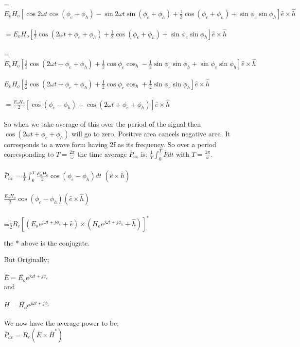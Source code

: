 =$E_{o}H_{o}[\cos2\omega t\cos(\phi_{e}+\phi_{h})-\sin2\omega t\sin(\phi_{e}+\phi_{h})+\frac{1}{2}\cos(\phi_{e}+\phi_{h})+\sin\phi_{e}\sin\phi_{h}]\hat{e}\times\hat{h} $\\\\$  =E_{o}H_{o}[\frac{1}{2}\cos(2\omega t+\phi_{e}+\phi_{h})+\frac{1}{2}\cos(\phi_{e}+\phi_{h})+\sin\phi_{e}\sin\phi_{h}]\hat{e}\times\hat{h} $\\\\ =$E_{o}H_{o}[\frac{1}{2}\cos(2\omega t+\phi_{e}+\phi_{h})+\frac{1}{2}\cos\phi_{e}\cos_{h} -\frac{1}{2}\sin\phi_{e}\sin\phi_{h}+\sin\phi_{e}\sin\phi_{h}]\hat{e}\times\hat{h} $\\\\$  E_{o}H_{o}[\frac{1}{2}\cos(2\omega t+\phi_{e}+\phi_{h})+\frac{1}{2}\cos\phi_{e}\cos_{h} +\frac{1}{2}\sin\phi_{e}\sin\phi_{h}]\hat{e}\times\hat{h} $\\\\$=\frac{ E_{o}H_{o}}{2}[\cos(\phi_{e}-\phi_{h})+\cos(2\omega t+\phi_{e}+\phi_{h})]\hat{e}\times\hat{h} $\\\\
So when we take average of this over the period of the signal then $\cos(2\omega t+\phi_{e}+\phi_{h})$ will go to zero. Positive area cancels negative area. It corresponds to a wave form having 2f as its frequency. So over a period corresponding to $ T=\frac{2\pi}{\omega} $ the time average $ \overline{P}_{av} $ is; $ \frac{1}{T}\int^{T}_{0}\overline{P}dt $ with $ T=\frac{2\pi}{\omega} $.\\\\$\overline{P}_{av}=\frac{1}{T}\int^{T}_{0} \frac{ E_{o}H_{o}}{2} \cos(\phi_{e}-\phi_{h})dt$ $( \hat{e}\times\hat{h}) $ \\\\
$ \frac{E_{o}H_{o}}{2} \cos(\phi_{e}-\phi_{h})(\hat{e}\times\hat{h}) $\\\\
=$\frac{1}{2} R_{e}[(E_{o}e^{j\omega t+j\phi_{e}}+\hat{e})\times(H_{o}e^{j\omega t+j\phi_{h}}+\hat{h})] ^{*}  $\\\begin{flushright}
	\begin{small}
		the * above is the conjugate.
	\end{small}
\end{flushright} But Originally;\\\\
$ \overline{E}=\overline{E_{o}}e^{j\omega t+j\phi_{e}}$\\
and\\\\
$ H=\overline{H_{o}}e^{j\omega t+j\phi_{e}} $\\\\ We now have the average power to be;\\
$\overline{P}_{av}=R_{e}(\overline{E}\times\overline{H}^{*})$\\\\



